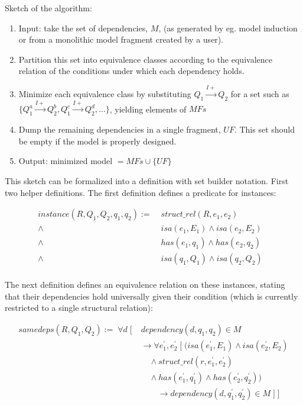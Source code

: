 \documentclass{article}
\begin{document}
Sketch of the algorithm:

\begin{enumerate}

\item Input: take the set of dependencies, $M$, (as generated by eg. model
	induction or from a monolithic model fragment created by a user).  

\item Partition this set into equivalence classes according to the
	equivalence relation of the conditions under which each dependency holds.

\item Minimize each equivalence class by substituting 
	$Q_1 \overset{I+}{\rightarrow} Q_2 $ for a set such as 
	$ \{ Q_1^a \overset{I+}{\rightarrow} Q_2^b, Q_1^c \overset{I+}{\rightarrow} Q_2^d,  . . . \} $, 
	yielding elements of $MFs$

\item Dump the remaining dependencies in a single fragment, $UF$. 
	This set should be empty if the model is properly designed.

\item Output: minimized model $ = MFs \cup \{ UF \} $

\end{enumerate}

This sketch can be formalized into a definition with set builder notation.
First two helper definitions. The first definition defines a predicate for
instances:

\begin{align*}
instance(R, Q_1, Q_2, q_1, q_2) :=
	\; &struct\_rel(R, e_1, e_2) & \\
	\land \; &isa(e_1, E_1) \land isa(e_2, E_2) \\
	\land \; &has(e_1, q_1) \land has(e_2, q_2)  \\
	\land \; &isa(q_1, Q_1) \land isa(q_2, Q_2) \\
\end{align*}

The next definition defines an equivalence relation on these instances, stating that
their dependencies hold universally given their condition (which is currently
restricted to a single structural relation):

\begin{align*}
samedeps(R, Q_1, Q_2) := \; \forall d \; [ \; &dependency(d, q_1, q_2) \in M \\
	& 	\rightarrow \forall e^\prime_1, e^\prime_2 \; [ \; ( isa(e^\prime_1, E_1) \land isa(e^\prime_2, E_2)  \\
	&	\quad 	\land struct\_rel(r, e^\prime_1, e^\prime_2)  \\
	&	\quad 	\land has(e^\prime_1, q^\prime_1) \land has(e^\prime_2, q^\prime_2) ) \\
	& \qquad \rightarrow dependency(d, q^\prime_1, q^\prime_2) \in M \; ] \; ]
\end{align*}
\end{document}
